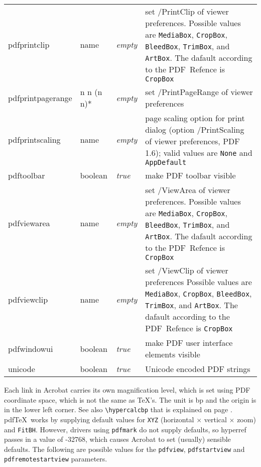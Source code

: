 \documentclass{article}
\begin{document}
\begin{longtable}{@{}>{\ttfamily}l>{\raggedright}p{}>{\itshape}lp{7cm}@{}}
pdfprintclip       & name    & empty & set /PrintClip of viewer preferences.  Possible values are
                                       \verb|MediaBox|, \verb|CropBox|,
                                       \verb|BleedBox|, \verb|TrimBox|, and \verb|ArtBox|.
                                       The dafault according to the PDF~Refence is \verb|CropBox| \\
pdfprintpagerange  & n n (n n)*
                             & empty & set /PrintPageRange of viewer preferences\\
pdfprintscaling    & name    & empty & page scaling option for print dialog
                                       (option /PrintScaling of viewer
                                       preferences, PDF 1.6);
                                       valid values are \verb|None| and
                                       \verb|AppDefault| \\
pdftoolbar         & boolean & true  & make PDF toolbar visible \\
pdfviewarea        & name    & empty & set /ViewArea of viewer preferences. Possible values are
                                       \verb|MediaBox|, \verb|CropBox|,
                                       \verb|BleedBox|, \verb|TrimBox|, and \verb|ArtBox|.
                                       The dafault according to the PDF~Refence is \verb|CropBox| \\
pdfviewclip        & name    & empty & set /ViewClip of viewer preferences Possible values are
                                       \verb|MediaBox|, \verb|CropBox|,
                                       \verb|BleedBox|, \verb|TrimBox|, and \verb|ArtBox|.
                                       The dafault according to the PDF~Refence is \verb|CropBox| \\
pdfwindowui        & boolean & true  & make PDF user interface elements visible \\
unicode            & boolean & true & Unicode encoded PDF strings
\end{longtable}

Each link in Acrobat carries its own magnification level, which is set
using PDF coordinate space, which is not the same as \TeX's. The unit
is bp and the origin is in the lower left corner. See also
\verb|\hypercalcbp| that is explained on page \pageref{hypercalcbp}.
pdf\TeX\
works by supplying default values for \texttt{XYZ} (horizontal $\times$
vertical $\times$ zoom) and \texttt{FitBH}. However, drivers using
\texttt{pdfmark} do not supply defaults, so \textsf{hyperref} passes in
a value of -32768, which causes Acrobat to set (usually) sensible
defaults. The following are possible values for the \texttt{pdfview},
\texttt{pdfstartview} and \texttt{pdfremotestartview} parameters.
\end{document}
